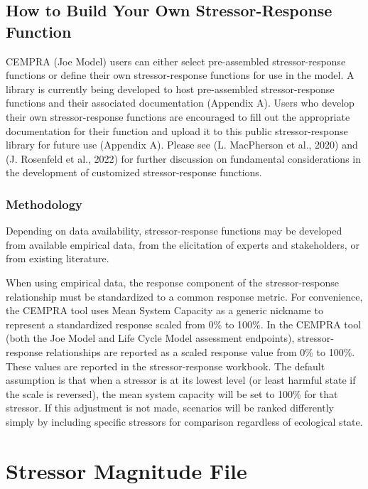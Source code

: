 \documentclass[
  letterpaper,
  DIV=11,
  numbers=noendperiod]{scrreprt}
\begin{document}
\subsection{How to Build Your Own Stressor-Response
Function}\label{how-to-build-your-own-stressor-response-function}

CEMPRA (Joe Model) users can either select pre-assembled
stressor-response functions or define their own stressor-response
functions for use in the model. A library is currently being developed
to host pre-assembled stressor-response functions and their associated
documentation (Appendix A). Users who develop their own
stressor-response functions are encouraged to fill out the appropriate
documentation for their function and upload it to this public
stressor-response library for future use (Appendix A). Please see (L.
MacPherson et al., 2020) and (J. Rosenfeld et al., 2022) for further
discussion on fundamental considerations in the development of
customized stressor-response functions.

\subsubsection{Methodology}\label{methodology}

Depending on data availability, stressor-response functions may be
developed from available empirical data, from the elicitation of experts
and stakeholders, or from existing literature.

When using empirical data, the response component of the
stressor-response relationship must be standardized to a common response
metric. For convenience, the CEMPRA tool uses Mean System Capacity as a
generic nickname to represent a standardized response scaled from 0\% to
100\%. In the CEMPRA tool (both the Joe Model and Life Cycle Model
assessment endpoints), stressor-response relationships are reported as a
scaled response value from 0\% to 100\%. These values are reported in
the stressor-response workbook. The default assumption is that when a
stressor is at its lowest level (or least harmful state if the scale is
reversed), the mean system capacity will be set to 100\% for that
stressor. If this adjustment is not made, scenarios will be ranked
differently simply by including specific stressors for comparison
regardless of ecological state.

\section{Stressor Magnitude File}\label{stressor-magnitude-file}
\end{document}
